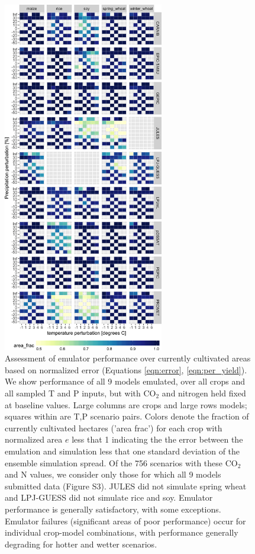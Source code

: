 \documentclass[gmd, manuscript]{copernicus} %
\begin{document}
\begin{figure}[ht]
\centering
    \includegraphics[width=7cm]{figures/error_360.png}
    \caption{Assessment of emulator performance over currently cultivated areas based on normalized error (Equations \ref{eqn:error}, \ref{eqn:per_yield}). We show performance of all 9 models emulated, over all crops and all sampled T and P inputs, but with CO$_2$ and nitrogen held fixed at baseline values. Large columns are crops and large rows models; squares within are T,P scenario pairs. Colors denote the fraction of currently cultivated hectares ('area frac') for each crop with normalized area $e$ less that 1 indicating the the error between the emulation and simulation less that one standard deviation of the ensemble simulation spread. Of the 756 scenarios with these CO$_2$ and N values, we consider only those for which all 9 models submitted data (Figure S3). JULES did not simulate spring wheat and LPJ-GUESS did not simulate rice and soy. Emulator performance is generally satisfactory, with some exceptions. Emulator failures (significant areas of poor performance) occur for individual crop-model combinations, with performance generally degrading for hotter and wetter scenarios.}
   \label{fig:error_360}
\end{figure}
\end{document}
